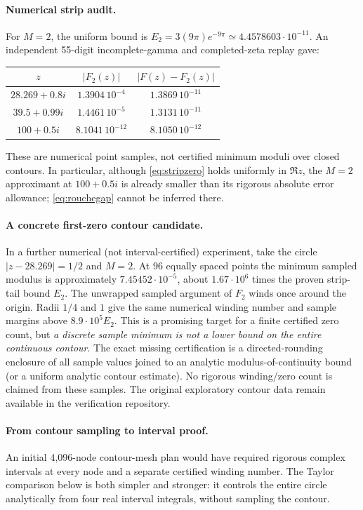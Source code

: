 \paragraph{Numerical strip audit.}
For $M=2$, the uniform bound is
$E_2=3(9\pi)e^{-9\pi}
\simeq4.4578603\cdot10^{-11}$.
An independent 55-digit
incomplete-gamma and
completed-zeta replay gave:
\begin{center}\small
\begin{tabular}{c c c}
\hline
$z$& $|F_2(z)|$ & $|F(z)-F_2(z)|$\\
\hline
$28.269+0.8i$&$1.3904\,10^{-4}$&
$1.3869\,10^{-11}$\\
$39.5+0.99i$&$1.4461\,10^{-5}$&
$1.3131\,10^{-11}$\\
$100+0.5i$&$8.1041\,10^{-12}$&
$8.1050\,10^{-12}$\\
\hline
\end{tabular}
\end{center}
These are numerical point samples,
not certified minimum moduli
over closed contours. In particular,
although \eqref{eq:stripzero}
holds uniformly in $\Re z$,
the $M=2$ approximant at
$100+0.5i$ is already smaller
than its rigorous absolute
error allowance; \eqref{eq:rouchegap}
cannot be inferred there.

\paragraph{A concrete first-zero contour candidate.}
In a further numerical (not interval-certified)
experiment, take the circle
$|z-28.269|=1/2$ and $M=2$.
At $96$ equally spaced points the
minimum sampled modulus is approximately
$7.45452\cdot10^{-5}$, about
$1.67\cdot10^6$ times the proven
strip-tail bound $E_2$.
The unwrapped sampled argument of
$F_2$ winds once around the origin.
Radii $1/4$ and $1$ give the same
numerical winding number and
sample margins above $8.9\cdot10^5E_2$.
This is a promising target for
a finite certified zero count,
but \emph{a discrete sample minimum is
not a lower bound on the entire
continuous contour}. The exact
missing certification is a
directed-rounding enclosure of all
sample values joined to an analytic
modulus-of-continuity bound (or
a uniform analytic contour estimate).
No rigorous winding/zero count
is claimed from these samples.
The original exploratory contour data
remain available in the verification repository.

\paragraph{From contour sampling to interval proof.}
An initial 4,096-node contour-mesh plan
would have required rigorous
complex intervals at every node
and a separate certified winding
number. The Taylor comparison
below is both simpler and stronger:
it controls the entire circle
analytically from four
real interval integrals, without
sampling the contour.

